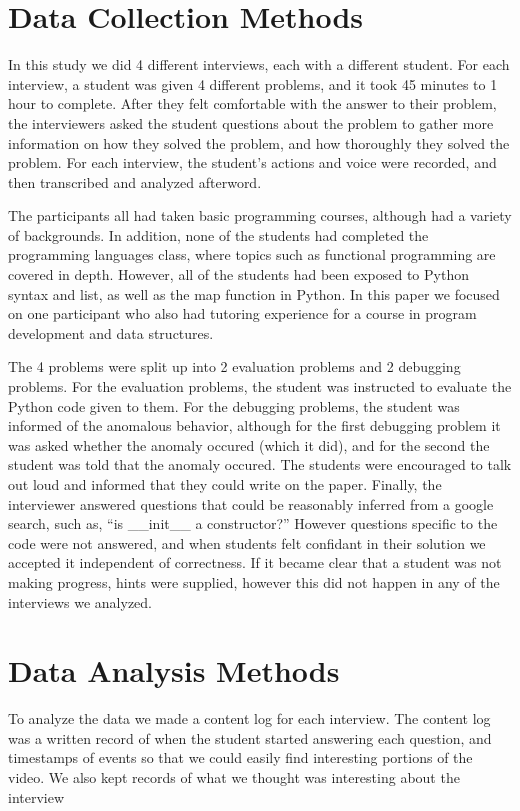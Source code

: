 \documentclass{article}
\begin{document}
\newpage
\section{Data Collection Methods}

In this study we did 4 different interviews, each with a different student.
For each interview, a student was given 4 different problems, and it took 45 minutes to 1 hour to complete.
After they felt comfortable with the answer to their problem,
 the interviewers asked the student questions about the problem to gather more information on how they solved the problem,
 and how thoroughly they solved the problem.
For each interview, the student's actions and voice were recorded, and then transcribed and analyzed afterword.

The participants all had taken basic programming courses, although had a variety of backgrounds.
In addition, none of the students had completed the programming languages class, where topics such as functional programming are covered in depth.
However, all of the students had been exposed to Python syntax and list, as well as the map function in Python.
In this paper we focused on one participant who also had tutoring experience for a course in program development and data structures.

The 4 problems were split up into 2 evaluation problems and 2 debugging problems.
For the evaluation problems, the student was instructed to evaluate the Python code given to them.
For the debugging problems, the student was informed of the anomalous behavior,
 although for the first debugging problem it was asked whether the anomaly occured (which it did),
 and for the second the student was told that the anomaly occured.
The students were encouraged to talk out loud and informed that they could write on the paper.
Finally, the interviewer answered questions that could be reasonably inferred from a google search, such as,
``is __init__ a constructor?''
However questions specific to the code were not answered, and when students felt confidant in their solution we accepted it independent of correctness.
If it became clear that a student was not making progress, hints were supplied, however this did not happen in any of the interviews we analyzed.


\newpage
\section{Data Analysis Methods}

To analyze the data we made a content log for each interview.
The content log was a written record of when the student started answering each question,
 and timestamps of events so that we could easily find interesting portions of the video.
We also kept records of what we thought was interesting about the interview 
\end{document}
